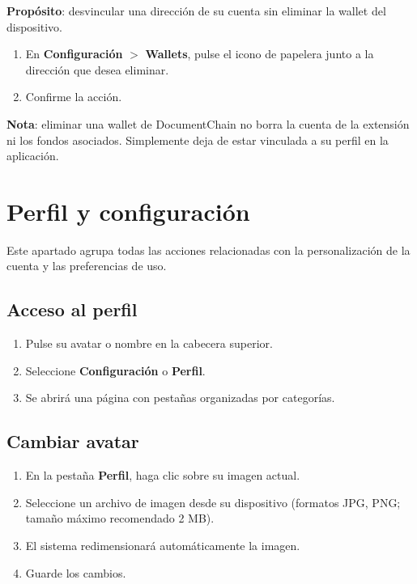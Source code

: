 \documentclass[11pt, a4paper]{article}
\begin{document}
\textbf{Prop\'{o}sito}: desvincular una direcci\'{o}n de su cuenta sin eliminar la wallet del dispositivo.

\begin{enumerate}
    \item En \textbf{Configuraci\'{o}n} $>$ \textbf{Wallets}, pulse el icono de papelera junto a la direcci\'{o}n que desea eliminar.
    \item Confirme la acci\'{o}n.
\end{enumerate}

\textbf{Nota}: eliminar una wallet de DocumentChain no borra la cuenta de la extensi\'{o}n ni los fondos asociados. Simplemente deja de estar vinculada a su perfil en la aplicaci\'{o}n.

\section{Perfil y configuraci\'{o}n}

Este apartado agrupa todas las acciones relacionadas con la personalizaci\'{o}n de la cuenta y las preferencias de uso.

\subsection{Acceso al perfil}

\begin{enumerate}
    \item Pulse su avatar o nombre en la cabecera superior.
    \item Seleccione \textbf{Configuraci\'{o}n} o \textbf{Perfil}.
    \item Se abrir\'{a} una p\'{a}gina con pesta\~{n}as organizadas por categor\'{i}as.
\end{enumerate}

\subsection{Cambiar avatar}

\begin{enumerate}
    \item En la pesta\~{n}a \textbf{Perfil}, haga clic sobre su imagen actual.
    \item Seleccione un archivo de imagen desde su dispositivo (formatos JPG, PNG; tama\~{n}o m\'{a}ximo recomendado 2 MB).
    \item El sistema redimensionar\'{a} autom\'{a}ticamente la imagen.
    \item Guarde los cambios.
\end{enumerate}
\end{document}
